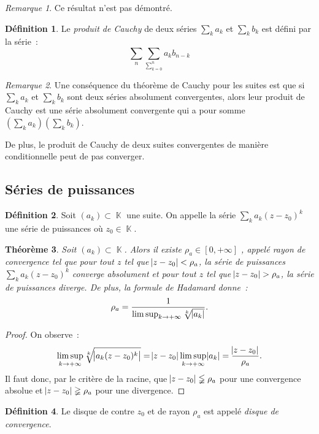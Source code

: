 \documentclass{article}
\DeclareMathOperator{\K}{\mathbb K}
\newtheorem{thm}{Théorème}[section]
\theoremstyle{definition}
\newtheorem{déf}[thm]{Définition}
\theoremstyle{remark}
\newtheorem*{rmq}{Remarque}
\begin{document}
		\begin{rmq} Ce résultat n'est pas démontré. \end{rmq}

		\begin{déf} Le \emph{produit de Cauchy} de deux séries $\sum_k a_k$ et $\sum_k b_k$ est défini par la série~:
		\[\sum_n\sum_{\sum_{k=0}^n}a_kb_{n-k}\]
		\end{déf}

		\begin{rmq} Une conséquence du théorème de Cauchy pour les suites est que si $\sum_k a_k$ et $\sum_k b_k$ sont deux séries absolument convergentes,
		alors leur produit de Cauchy est une série absolument convergente qui a pour somme $\left(\sum_k a_k\right)\left(\sum_k b_k\right)$.

		De plus, le produit de Cauchy de deux suites convergentes de manière conditionnelle peut de pas converger.
		\end{rmq}

	\subsection{Séries de puissances}
		\begin{déf} Soit $(a_k) \subset \K$ une suite. On appelle la série $\sum_k a_k(z-z_0)^k$ une série de puissances où $z_0 \in \K$.
		\end{déf}

		\begin{thm}\label{thm:rayondeconvergence} Soit $(a_k) \subset \K$. Alors il existe $\rho_a \in [0, +\infty]$ , appelé \emph{rayon de convergence} tel
		que pour tout $z$ tel que $\abs {z-z_0} < \rho_a$, la série de puissances $\sum_k a_k(z-z_0)^k$ converge absolument et pour tout $z$ tel que
		$\abs{z-z_0} > \rho_a$, la série de puissances diverge. De plus, la \emph{formule de Hadamard} donne~:
		\[\rho_a = \frac 1{\limsup_{k \to +\infty} \sqrt[k] {\abs{a_k}}}.\]
		\end{thm}

		\begin{proof} On observe~:
		\[\limsup_{k \to +\infty} \sqrt[k] {\abs{a_k(z-z_0)^k}} = \abs{z-z_0}\limsup_{k \to +\infty}\abs {a_k} = \frac {\abs {z-z_0}}{\rho_a}.\]
		Il faut donc, par le critère de la racine, que $\abs{z-z_0} \lneqq \rho_a$ pour une convergence absolue et $\abs{z-z_0} \gneqq \rho_a$ pour une
		divergence.
		\end{proof}

		\begin{déf} Le disque de contre $z_0$ et de rayon $\rho_a$ est appelé \emph{disque de convergence}. \end{déf}
\end{document}
